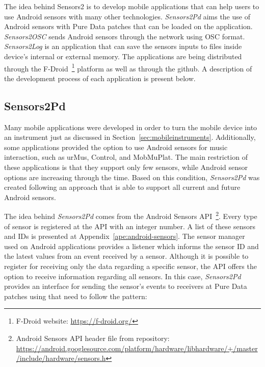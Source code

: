 The idea behind Sensors2 is to develop mobile applications that can help users to use Android sensors with many other technologies.
\textit{Sensors2Pd} aims the use of Android sensors with Pure Data patches that can be loaded on the application.
\textit{Sensors2OSC} sends Android sensors through the network using OSC format.
\textit{Sensors2Log} is an application that can save the sensors inputs to files inside device's internal or external memory.
The applications are being distributed through the F-Droid~\footnote{F-Droid website: \url{https://f-droid.org/}} platform as well as through the github.
A description of the development process of each application is present below.

\subsection*{Sensors2Pd}
\label{subsec:appsensors2pd}

Many mobile applications were developed in order to turn the mobile device into an instrument just as discussed in Section~\ref{sec:mobileinstruments}.
Additionally, some applications provided the option to use Android sensors for music interaction, such as urMus, Control, and MobMuPlat.
The main restriction of these applications is that they support only few sensors, while Android sensor options are increasing through the time.
Based on this condition, \textit{Sensors2Pd} was created following an approach that is able to support all current and future Android sensors.

The idea behind \textit{Sensors2Pd} comes from the Android Sensors API~\footnote{Android Sensors API header file from repository: \url{https://android.googlesource.com/platform/hardware/libhardware/+/master/include/hardware/sensors.h}}.
Every type of sensor is registered at the API with an integer number.
A list of these sensors and IDs is presented at Appendix~\ref{ape:android-sensors}.
The sensor manager used on Android applications provides a listener which informs the sensor ID and the latest values from an event received by a sensor. %
Although it is possible to register for receiving only the data regarding a specific sensor, the API offers the option to receive information regarding all sensors.
In this case, \textit{Sensors2Pd} provides an interface for sending the sensor's events to receivers at Pure Data patches using that need to follow the pattern:

